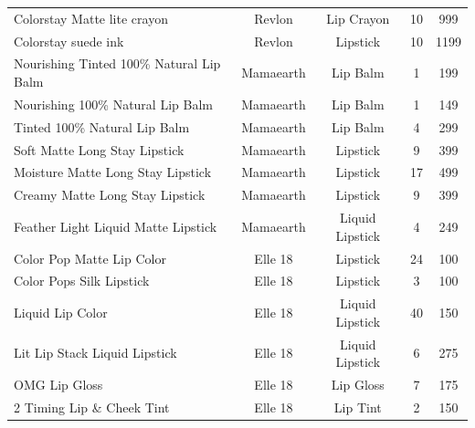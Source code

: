 \documentclass{article}
\begin{document}
\begin{longtable}{lcccc}
    Colorstay Matte lite crayon                         & Revlon          & Lip Crayon      & 10              & 999            \\
    Colorstay suede ink                                 & Revlon          & Lipstick        & 10              & 1199           \\
    Nourishing Tinted 100\% Natural Lip Balm            & Mamaearth       & Lip Balm        & 1               & 199            \\
    Nourishing 100\% Natural Lip Balm                   & Mamaearth       & Lip Balm        & 1               & 149            \\
    Tinted 100\% Natural Lip Balm                       & Mamaearth       & Lip Balm        & 4               & 299            \\
    Soft Matte Long Stay Lipstick                       & Mamaearth       & Lipstick        & 9               & 399            \\
    Moisture Matte Long Stay Lipstick                   & Mamaearth       & Lipstick        & 17              & 499            \\
    Creamy Matte Long Stay Lipstick                     & Mamaearth       & Lipstick        & 9               & 399            \\
    Feather Light Liquid Matte Lipstick                 & Mamaearth       & Liquid Lipstick & 4               & 249            \\
    Color Pop Matte Lip Color                           & Elle 18         & Lipstick        & 24              & 100            \\
    Color Pops Silk Lipstick                            & Elle 18         & Lipstick        & 3               & 100            \\
    Liquid Lip Color                                    & Elle 18         & Liquid Lipstick & 40              & 150            \\
    Lit Lip Stack Liquid Lipstick                       & Elle 18         & Liquid Lipstick & 6               & 275            \\
    OMG Lip Gloss                                       & Elle 18         & Lip Gloss       & 7               & 175            \\
    2 Timing Lip \& Cheek Tint                          & Elle 18         & Lip Tint        & 2               & 150            \\
\end{longtable}
\newpage
\end{document}
